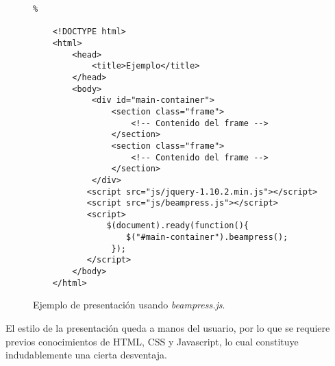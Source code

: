 			\begin{figure}[htb]%
				\begin{lstlisting}%

	<!DOCTYPE html>
	<html>
		<head>
	    	<title>Ejemplo</title>
		</head>
		<body>
			<div id="main-container">
				<section class="frame">
					<!-- Contenido del frame -->
				</section>
				<section class="frame">
					<!-- Contenido del frame -->
				</section>						
			</div>
		   <script src="js/jquery-1.10.2.min.js"></script>
		   <script src="js/beampress.js"></script>
		   <script>
		       $(document).ready(function(){     
		           $("#main-container").beampress();
		        });
		   </script>		
		</body>
	</html>			
				\end{lstlisting}
			\caption{
				Ejemplo de presentación usando \textit{beampress.js}. 
				\label{fig:ex5} }
			\end{figure}	

		El estilo de la presentación queda a manos del usuario, por lo que se requiere previos conocimientos 
		de HTML, CSS y Javascript, lo cual constituye indudablemente una cierta desventaja. 

		
